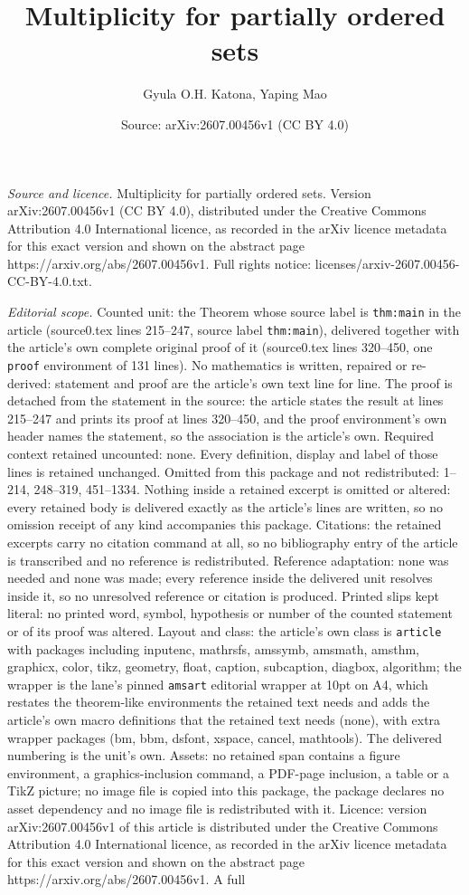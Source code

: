 \documentclass[10pt,a4paper]{amsart}
\title[Multiplicity for partially ordered sets]{Multiplicity for partially ordered sets}
\author{Gyula O.H. Katona, Yaping Mao}
\date{Source: arXiv:2607.00456v1 (CC BY 4.0)}
\begin{document}
\maketitle

\noindent\emph{Source and licence.} Multiplicity for partially ordered sets. Version arXiv:2607.00456v1 (CC BY 4.0), distributed under the Creative Commons Attribution 4.0 International licence, as recorded in the arXiv licence metadata for this exact version and shown on the abstract page https://arxiv.org/abs/2607.00456v1. Full rights notice: licenses/arxiv-2607.00456-CC-BY-4.0.txt.\par\smallskip

\noindent\textit{Editorial scope.} Counted unit: the Theorem whose source label is \texttt{thm:main} in the article (source0.tex lines 215--247, source label \texttt{thm:main}), delivered together with the article's own complete original proof of it (source0.tex lines 320--450, one \texttt{proof} environment of 131 lines). No mathematics is written, repaired or re-derived: statement and proof are the article's own text line for line. The proof is detached from the statement in the source: the article states the result at lines 215--247 and prints its proof at lines 320--450, and the proof environment's own header names the statement, so the association is the article's own. Required context retained uncounted: none. Every definition, display and label of those lines is retained unchanged. Omitted from this package and not redistributed: 1--214, 248--319, 451--1334. Nothing inside a retained excerpt is omitted or altered: every retained body is delivered exactly as the article's lines are written, so no omission receipt of any kind accompanies this package. Citations: the retained excerpts carry no citation command at all, so no bibliography entry of the article is transcribed and no reference is redistributed. Reference adaptation: none was needed and none was made; every reference inside the delivered unit resolves inside it, so no unresolved reference or citation is produced. Printed slips kept literal: no printed word, symbol, hypothesis or number of the counted statement or of its proof was altered. Layout and class: the article's own class is \texttt{article} with packages including inputenc, mathrsfs, amssymb, amsmath, amsthm, graphicx, color, tikz, geometry, float, caption, subcaption, diagbox, algorithm; the wrapper is the lane's pinned \texttt{amsart} editorial wrapper at 10pt on A4, which restates the theorem-like environments the retained text needs and adds the article's own macro definitions that the retained text needs (none), with extra wrapper packages (bm, bbm, dsfont, xspace, cancel, mathtools). The delivered numbering is the unit's own. Assets: no retained span contains a figure environment, a graphics-inclusion command, a PDF-page inclusion, a table or a TikZ picture; no image file is copied into this package, the package declares no asset dependency and no image file is redistributed with it. Licence: version arXiv:2607.00456v1 of this article is distributed under the Creative Commons Attribution 4.0 International licence, as recorded in the arXiv licence metadata for this exact version and shown on the abstract page https://arxiv.org/abs/2607.00456v1. A full 
\end{document}
